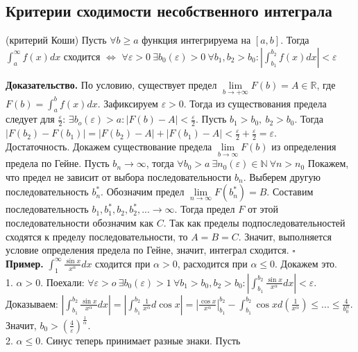 \subsection{Критерии сходимости несобственного интеграла}
\begin{theor} (критерий Коши)
    Пусть $\forall b\geqslant a$ функция интегрируема на $[a,b]$. 
    Тогда $\int_a^\infty f(x)dx$ сходится $\Leftrightarrow$ $\forall 
    \varepsilon>0~\exists b_0(\varepsilon)>0~\forall b_1,b_2>b_0:
    \left| \int_{b_1}^{b_2}f(x)dx \right|<\varepsilon$
\end{theor}
\textbf{Доказательство.} По условию, существует предел 
$\lim\limits_{b \to +\infty} F(b)=A\in \mathbb{R}$, где
$F(b)=\int^b_af(x)dx$. 
Зафиксируем $\varepsilon>0$. Тогда из существования предела следует
для $\frac{\varepsilon}{2}$: $\exists b_o(\varepsilon)>a:\left| 
F(b)-A\right|<\frac{\varepsilon}{2}$. Пусть $b_1>b_0,~b_2>b_0$. Тогда
$|F(b_2)-F(b_1)|=|F(b_2)-A|+|F(b_1)-A|<\frac{\varepsilon}{2}+
\frac{\varepsilon}{2}=\varepsilon$.\\
Достаточность. Докажем существование предела  $\lim\limits_{b\to\infty}F(b)$
из определения предела по Гейне. Пусть $b_n\to \infty$, тогда $\forall b_0>a
~\exists n_0(\varepsilon)\in \mathbb{N}~\forall n>n_0$ 
Покажем, что предел не зависит от выбора последовательности $b_n$. 
Выберем другую последовательность  $b^*_n$. Обозначим предел 
$\lim\limits_{n \to \infty} F(b^*_n)=B$. Составим последовательность
$b_1,b^*_1,b_2,b^*_2,...\to \infty$. Тогда предел $F$ от этой
последовательности обозначим как  $C$. Так как пределы подпоследовательностей 
сходятся к пределу последовательности, то  $A=B=C$. Значит, выполняется
условие определения предела по Гейне, значит, интеграл сходится. $\square$\\
\textbf{Пример.} $\int_1^\infty \frac{\sin x}{x^\alpha}dx$ сходится при 
$\alpha>0$, расходится при $\alpha\leqslant 0$. Докажем это.\\
1. $\alpha>0$. Поехали: $\forall \varepsilon>o~\exists b_0(\varepsilon)>1~
\forall b_1>b_0,b_2>b_0: \left| \int^{b_2}_{b_1} \frac{\sin x}{x^\alpha}dx
\right|<\varepsilon$. Доказываем: 
$\left| \int^{b_2}_{b_1} \frac{\sin x}{x^\alpha}dx
\right|=\left| \int^{b_2}_{b_1} \frac{1}{x^\alpha}d\cos x\right|=
\left| \frac{\cos x}{x^\alpha} \right|^{b_2}_{b_1}-\int^{b_2}_{b_1} 
\cos x d(\frac{1}{x^\alpha})\leqslant ... \leqslant\frac{4}{b^\alpha_0}$.
Значит, $b_0>(\frac{4}{\varepsilon})^\frac{1}{\alpha}$.\\
2. $\alpha\leqslant 0$. Синус теперь принимает разные знаки. Пусть 
